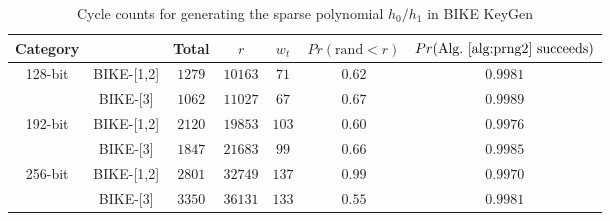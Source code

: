 \documentclass[runningheads]{llncs}
\begin{document}
\begin{table}[!tb]\centering
\caption{Cycle counts for generating the sparse polynomial $h_0/h_1$ in BIKE KeyGen}
\begin{tabular}{cc|ccccc}
  \hline
 \textbf{Category}        &             & Total & $r$  & $w_t$  & $Pr(\text{rand} < r)$& $Pr(\text{Alg.~\ref{alg:prng2} succeeds})$\\\hline
\multirow{ 2}{*}{128-bit} &  BIKE-[1,2] & $1279$ & $10163$  & $71$  & $0.62$ & $0.9981$\\
                          &  BIKE-[3] & $1062$ & $11027$  & $67$  & $0.67$& $0.9989$\\
  \hline
\multirow{ 2}{*}{192-bit} &  BIKE-[1,2] & $2120$ & $19853$  & $103$  &$0.60$& $0.9976$\\
                          &  BIKE-[3] & $1847$ & $21683$  & $99$  &$0.66$& $0.9985$\\
  \hline
\multirow{ 2}{*}{256-bit} &  BIKE-[1,2] & $2801$ & $32749$  & $137$  &$0.99$& $0.9970$\\
                          &  BIKE-[3] & $3350$ & $36131$  & $133$  &$0.55$& $0.9981$\\
  \hline
\end{tabular}
\end{table}
\end{document}
